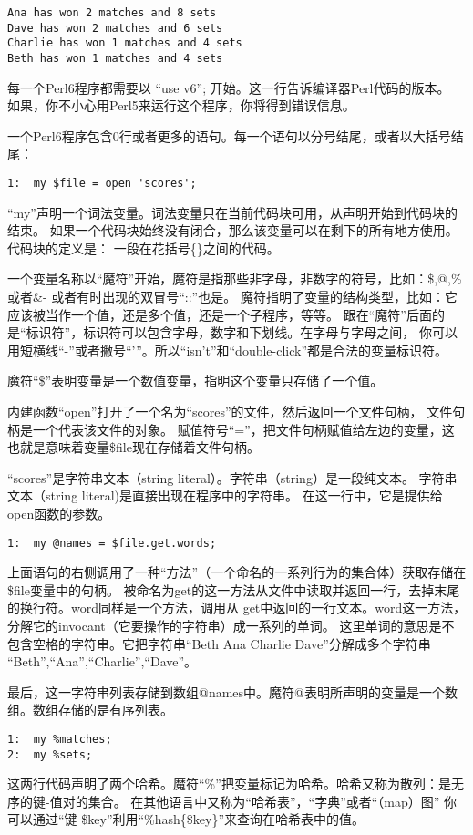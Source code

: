 \documentclass[11pt]{ctexart}
\begin{document}
\begin{verbatim}
Ana has won 2 matches and 8 sets
Dave has won 2 matches and 6 sets
Charlie has won 1 matches and 4 sets
Beth has won 1 matches and 4 sets
\end{verbatim}
每一个Perl6程序都需要以 “use v6”; 开始。这一行告诉编译器Perl代码的版本。
如果，你不小心用Perl5来运行这个程序，你将得到错误信息。

一个Perl6程序包含0行或者更多的语句。每一个语句以分号结尾，或者以大括号结尾：

\begin{verbatim}
1:  my $file = open 'scores';
\end{verbatim}
``my''声明一个词法变量。词法变量只在当前代码块可用，从声明开始到代码块的结束。
如果一个代码块始终没有闭合，那么该变量可以在剩下的所有地方使用。代码块的定义是：
一段在花括号\{\}之间的代码。

一个变量名称以“魔符”开始，魔符是指那些非字母，非数字的符号，比如：\$,@,\% 或者\&-
或者有时出现的双冒号“::”也是。
魔符指明了变量的结构类型，比如：它应该被当作一个值，还是多个值，还是一个子程序，等等。
跟在“魔符”后面的是“标识符”，标识符可以包含字母，数字和下划线。在字母与字母之间，
你可以用短横线“-”或者撇号“'”。所以“isn't”和“double-click”都是合法的变量标识符。

魔符“\$”表明变量是一个数值变量，指明这个变量只存储了一个值。

内建函数“open”打开了一个名为“scores”的文件，然后返回一个文件句柄，
文件句柄是一个代表该文件的对象。
赋值符号“=”，把文件句柄赋值给左边的变量，这也就是意味着变量\$file现在存储着文件句柄。

“scores”是字符串文本（string literal）。字符串（string）是一段纯文本。
字符串文本（string literal)是直接出现在程序中的字符串。
在这一行中，它是提供给open函数的参数。


\begin{verbatim}
1:  my @names = $file.get.words;
\end{verbatim}
上面语句的右侧调用了一种“方法”（一个命名的一系列行为的集合体）获取存储在\$file变量中的句柄。
被命名为get的这一方法从文件中读取并返回一行，去掉末尾的换行符。word同样是一个方法，调用从
get中返回的一行文本。word这一方法，分解它的invocant（它要操作的字符串）成一系列的单词。
这里单词的意思是不包含空格的字符串。它把字符串“Beth Ana Charlie Dave”分解成多个字符串
“Beth”,“Ana”,“Charlie”,“Dave”。

最后，这一字符串列表存储到数组@names中。魔符@表明所声明的变量是一个数组。数组存储的是有序列表。


\begin{verbatim}
1:  my %matches;
2:  my %sets;
\end{verbatim}
这两行代码声明了两个哈希。魔符“\%”把变量标记为哈希。哈希又称为散列：是无序的键-值对的集合。
在其他语言中又称为“哈希表”，“字典”或者“（map）图”
你可以通过“键 \$key”利用“\%hash\{\$key\}”来查询在哈希表中的值。
\end{document}
